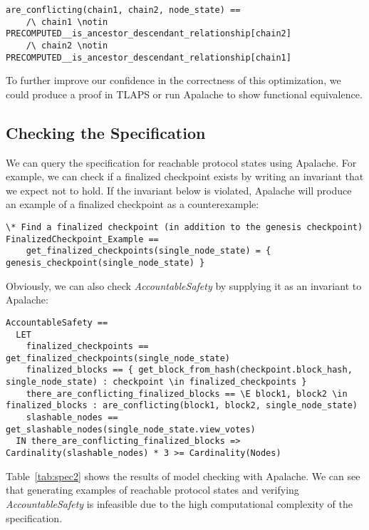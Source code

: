 \begin{lstlisting}[language=tla]
are_conflicting(chain1, chain2, node_state) ==
    /\ chain1 \notin PRECOMPUTED__is_ancestor_descendant_relationship[chain2]
    /\ chain2 \notin PRECOMPUTED__is_ancestor_descendant_relationship[chain1]
\end{lstlisting}

To further improve our confidence in the correctness of this optimization, we
could produce a proof in TLAPS or run Apalache to show functional equivalence.

\subsection{Checking the Specification}

We can query the specification for reachable protocol states using Apalache.
For example, we can check if a finalized checkpoint exists by writing an
invariant that we expect not to hold. If the invariant below is violated,
Apalache will produce an example of a finalized checkpoint as a counterexample:

\begin{lstlisting}[language=tla]
\* Find a finalized checkpoint (in addition to the genesis checkpoint)
FinalizedCheckpoint_Example ==
    get_finalized_checkpoints(single_node_state) = { genesis_checkpoint(single_node_state) }
\end{lstlisting}

Obviously, we can also check \textit{AccountableSafety} by supplying it as an
invariant to Apalache:

\begin{lstlisting}[language=tla]
AccountableSafety ==
  LET
    finalized_checkpoints == get_finalized_checkpoints(single_node_state)
    finalized_blocks == { get_block_from_hash(checkpoint.block_hash, single_node_state) : checkpoint \in finalized_checkpoints }
    there_are_conflicting_finalized_blocks == \E block1, block2 \in finalized_blocks : are_conflicting(block1, block2, single_node_state)
    slashable_nodes == get_slashable_nodes(single_node_state.view_votes)
  IN there_are_conflicting_finalized_blocks => Cardinality(slashable_nodes) * 3 >= Cardinality(Nodes)
\end{lstlisting}

Table~\ref{tab:spec2} shows the results of model checking \SpecTwo{} with
Apalache. We can see that generating examples of reachable protocol states and
verifying \textit{AccountableSafety} is infeasible due to the high computational
complexity of the specification.

